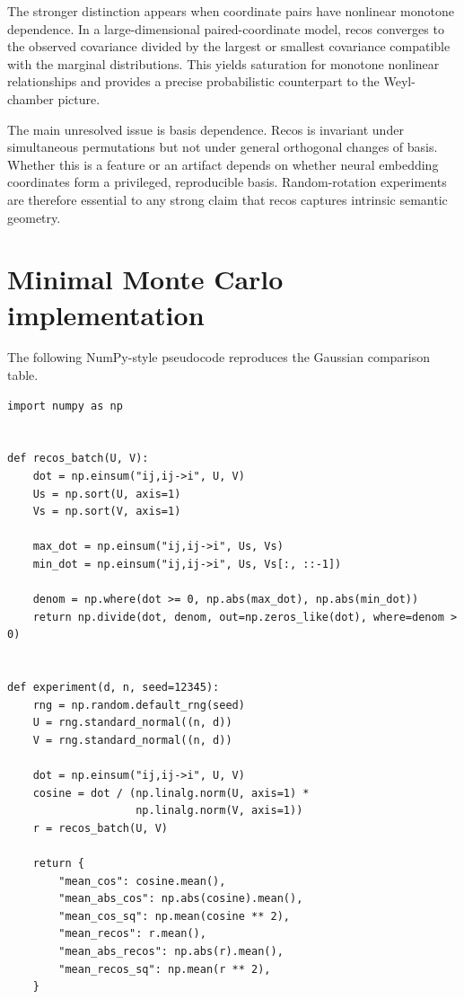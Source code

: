 \documentclass[11pt,a4paper]{article}
\begin{document}
The stronger distinction appears when coordinate pairs have nonlinear monotone dependence. In a large-dimensional paired-coordinate model, recos converges to the observed covariance divided by the largest or smallest covariance compatible with the marginal distributions. This yields saturation for monotone nonlinear relationships and provides a precise probabilistic counterpart to the Weyl-chamber picture.

The main unresolved issue is basis dependence. Recos is invariant under simultaneous permutations but not under general orthogonal changes of basis. Whether this is a feature or an artifact depends on whether neural embedding coordinates form a privileged, reproducible basis. Random-rotation experiments are therefore essential to any strong claim that recos captures intrinsic semantic geometry.

\appendix

\section{Minimal Monte Carlo implementation}

The following NumPy-style pseudocode reproduces the Gaussian comparison table.

\begin{verbatim}
import numpy as np


def recos_batch(U, V):
    dot = np.einsum("ij,ij->i", U, V)
    Us = np.sort(U, axis=1)
    Vs = np.sort(V, axis=1)

    max_dot = np.einsum("ij,ij->i", Us, Vs)
    min_dot = np.einsum("ij,ij->i", Us, Vs[:, ::-1])

    denom = np.where(dot >= 0, np.abs(max_dot), np.abs(min_dot))
    return np.divide(dot, denom, out=np.zeros_like(dot), where=denom > 0)


def experiment(d, n, seed=12345):
    rng = np.random.default_rng(seed)
    U = rng.standard_normal((n, d))
    V = rng.standard_normal((n, d))

    dot = np.einsum("ij,ij->i", U, V)
    cosine = dot / (np.linalg.norm(U, axis=1) *
                    np.linalg.norm(V, axis=1))
    r = recos_batch(U, V)

    return {
        "mean_cos": cosine.mean(),
        "mean_abs_cos": np.abs(cosine).mean(),
        "mean_cos_sq": np.mean(cosine ** 2),
        "mean_recos": r.mean(),
        "mean_abs_recos": np.abs(r).mean(),
        "mean_recos_sq": np.mean(r ** 2),
    }
\end{verbatim}
\end{document}
